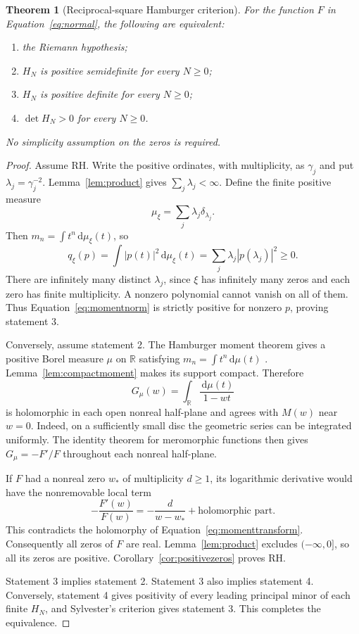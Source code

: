 \documentclass[11pt,letterpaper]{article}
\numberwithin{equation}{section}
\newtheorem{theorem}{Theorem}[section]
\theoremstyle{definition}
\theoremstyle{remark}
\newcommand{\R}{\mathbb R}
\newcommand{\dd}{\,\mathrm d}
\begin{document}
\begin{theorem}[Reciprocal-square Hamburger criterion]
\label{thm:moment}
For the function $F$ in Equation~\eqref{eq:normal}, the following are equivalent:
\begin{enumerate}
 \item the Riemann hypothesis;
 \item $H_N$ is positive semidefinite for every $N\geq0$;
 \item $H_N$ is positive definite for every $N\geq0$;
 \item $\det H_N>0$ for every $N\geq0$.
\end{enumerate}
No simplicity assumption on the zeros is required.
\end{theorem}
\begin{proof}
Assume RH. Write the positive ordinates, with multiplicity, as $\gamma_j$ and put $\lambda_j=\gamma_j^{-2}$. Lemma~\ref{lem:product} gives $\sum_j\lambda_j<\infty$. Define the finite positive measure
\begin{equation}
 \mu_\xi=\sum_j\lambda_j\delta_{\lambda_j}.
 \label{eq:selfweighted}
\end{equation}
Then $m_n=\int t^n\dd\mu_\xi(t)$, so
\begin{equation}
 q_\xi(p)=\int|p(t)|^2\dd\mu_\xi(t)
         =\sum_j\lambda_j|p(\lambda_j)|^2\geq0.
 \label{eq:momentnorm}
\end{equation}
There are infinitely many distinct $\lambda_j$, since $\xi$ has infinitely many zeros and each zero has finite multiplicity. A nonzero polynomial cannot vanish on all of them. Thus Equation~\eqref{eq:momentnorm} is strictly positive for nonzero $p$, proving statement 3.

Conversely, assume statement 2. The Hamburger moment theorem gives a positive Borel measure $\mu$ on $\R$ satisfying $m_n=\int t^n\dd\mu(t)$ \cite{schmudgen}. Lemma~\ref{lem:compactmoment} makes its support compact. Therefore
\begin{equation}
 G_\mu(w)=\int_\R\frac{\dd\mu(t)}{1-wt}
 \label{eq:momenttransform}
\end{equation}
is holomorphic in each open nonreal half-plane and agrees with $M(w)$ near $w=0$. Indeed, on a sufficiently small disc the geometric series can be integrated uniformly. The identity theorem for meromorphic functions then gives $G_\mu=-F'/F$ throughout each nonreal half-plane.

If $F$ had a nonreal zero $w_*$ of multiplicity $d\geq1$, its logarithmic derivative would have the nonremovable local term
\[
 -\frac{F'(w)}{F(w)}=-\frac{d}{w-w_*}+\text{holomorphic part}.
\]
This contradicts the holomorphy of Equation~\eqref{eq:momenttransform}. Consequently all zeros of $F$ are real. Lemma~\ref{lem:product} excludes $(-\infty,0]$, so all its zeros are positive. Corollary~\ref{cor:positivezeros} proves RH.

Statement 3 implies statement 2. Statement 3 also implies statement 4. Conversely, statement 4 gives positivity of every leading principal minor of each finite $H_N$, and Sylvester's criterion gives statement 3. This completes the equivalence.
\end{proof}
\end{document}
